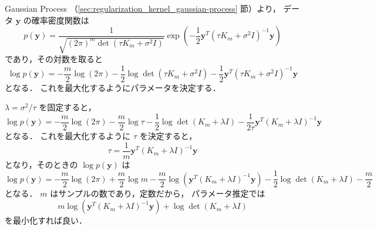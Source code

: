 Gaussian Process （\ref{sec:regularization_kernel_gaussian-process} 節）より，
データ $\bm{y}$ の確率密度関数は
\begin{equation}
    p(\bm{y}) = \frac{1}{\sqrt{(2\pi)^{m} \det(\tau K_m + \sigma^2 I)}}
    \exp\left(-\frac{1}{2} \bm{y}^T (\tau K_m + \sigma^2 I)^{-1} \bm{y} \right)
\end{equation}
であり，その対数を取ると
\begin{equation}
    \log{p(\bm{y})}
    = -\frac{m}{2}\log(2\pi)
    - \frac{1}{2} \log{\det(\tau K_m + \sigma^2 I)}
    - \frac{1}{2} \bm{y}^T (\tau K_m + \sigma^2 I)^{-1} \bm{y}
\end{equation}
となる．
これを最大化するようにパラメータを決定する．

$\lambda = \sigma^2 / \tau$ を固定すると，
\begin{equation}
    \log{p(\bm{y})}
    = -\frac{m}{2}\log(2\pi)
    - \frac{m}{2} \log{\tau}
    - \frac{1}{2} \log{\det(K_m + \lambda I)}
    - \frac{1}{2\tau} \bm{y}^T (K_m + \lambda I)^{-1} \bm{y}
\end{equation}
となる．
これを最大化するように $\tau$ を決定すると，
\begin{equation}
    \tau = \frac{1}{m} \bm{y}^T (K_m + \lambda I)^{-1} \bm{y}
\end{equation}
となり，そのときの $\log{p(\bm{y})}$ は
\begin{equation}
    \log{p(\bm{y})}
    = -\frac{m}{2}\log(2\pi)
    + \frac{m}{2} \log{m}
    - \frac{m}{2} \log(\bm{y}^T (K_m + \lambda I)^{-1} \bm{y})
    - \frac{1}{2} \log{\det(K_m + \lambda I)}
    - \frac{m}{2}
\end{equation}
となる．
$m$ はサンプルの数であり，定数だから，
パラメータ推定では
\begin{equation}
    m \log(\bm{y}^T (K_m + \lambda I)^{-1} \bm{y})
    + \log{\det(K_m + \lambda I)}
\end{equation}
を最小化すれば良い．
